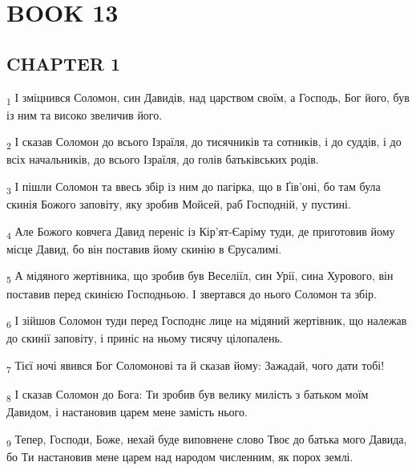 \section{BOOK 13}
\subsection{CHAPTER 1}
\begin{tcolorbox}
\textsubscript{1} І зміцнився Соломон, син Давидів, над царством своїм, а Господь, Бог його, був із ним та високо звеличив його.
\end{tcolorbox}
\begin{tcolorbox}
\textsubscript{2} І сказав Соломон до всього Ізраїля, до тисячників та сотників, і до суддів, і до всіх начальників, до всього Ізраїля, до голів батьківських родів.
\end{tcolorbox}
\begin{tcolorbox}
\textsubscript{3} І пішли Соломон та ввесь збір із ним до пагірка, що в Ґів'оні, бо там була скинія Божого заповіту, яку зробив Мойсей, раб Господній, у пустині.
\end{tcolorbox}
\begin{tcolorbox}
\textsubscript{4} Але Божого ковчега Давид переніс із Кір'ят-Єаріму туди, де приготовив йому місце Давид, бо він поставив йому скинію в Єрусалимі.
\end{tcolorbox}
\begin{tcolorbox}
\textsubscript{5} А мідяного жертівника, що зробив був Веселіїл, син Урії, сина Хурового, він поставив перед скинією Господньою. І звертався до нього Соломон та збір.
\end{tcolorbox}
\begin{tcolorbox}
\textsubscript{6} І зійшов Соломон туди перед Господнє лице на мідяний жертівник, що належав до скинії заповіту, і приніс на ньому тисячу цілопалень.
\end{tcolorbox}
\begin{tcolorbox}
\textsubscript{7} Тієї ночі явився Бог Соломонові та й сказав йому: Зажадай, чого дати тобі!
\end{tcolorbox}
\begin{tcolorbox}
\textsubscript{8} І сказав Соломон до Бога: Ти зробив був велику милість з батьком моїм Давидом, і настановив царем мене замість нього.
\end{tcolorbox}
\begin{tcolorbox}
\textsubscript{9} Тепер, Господи, Боже, нехай буде виповнене слово Твоє до батька мого Давида, бо Ти настановив мене царем над народом численним, як порох землі.
\end{tcolorbox}
